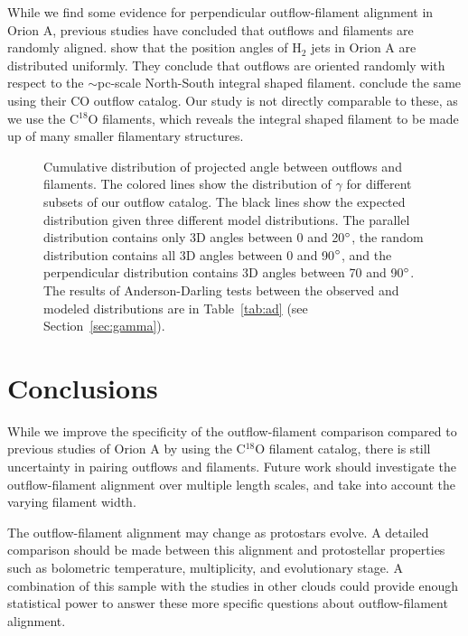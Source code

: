 \documentclass[twocolumn]{aastex63}
\begin{document}
While we find some evidence for perpendicular outflow-filament alignment in Orion A, previous studies have concluded that outflows and filaments are randomly aligned. \citet{Davis09} show that the position angles of H$_2$ jets in Orion A are distributed uniformly. They conclude that outflows are oriented randomly with respect to the $\sim$pc-scale North-South integral shaped filament. \citet{Tanabe:submitted} conclude the same using their CO outflow catalog. Our study is not directly comparable to these, as we use the C$^18$O filaments, which reveals the integral shaped filament to be made up of many smaller filamentary structures.

\begin{figure*}
\caption{Cumulative distribution of projected angle between outflows and filaments. The colored lines show the distribution of $\gamma$ for different subsets of our outflow catalog. The black lines show the expected distribution given three different model distributions. The parallel distribution contains only 3D angles between 0 and 20$\mbox{$^\circ$}$, the random distribution contains all 3D angles between 0 and 90$\mbox{$^\circ$}$, and the perpendicular distribution contains 3D angles between 70 and 90$\mbox{$^\circ$}$. The results of Anderson-Darling tests between the observed and modeled distributions are in Table~\ref{tab:ad} (see Section~\ref{sec:gamma}).\label{fig:gamma_cdf}}
\end{figure*}

\section{Conclusions}






While we improve the specificity of the outflow-filament comparison compared to previous studies of Orion A by using the C$^{18}$O filament catalog, there is still uncertainty in pairing outflows and filaments. Future work should investigate the outflow-filament alignment over multiple length scales, and take into account the varying filament width.

The outflow-filament alignment may change as protostars evolve. A detailed comparison should be made between this alignment and protostellar properties such as bolometric temperature, multiplicity, and evolutionary stage. A combination of this sample with the studies in other clouds could provide enough statistical power to answer these more specific questions about outflow-filament alignment.
\end{document}
